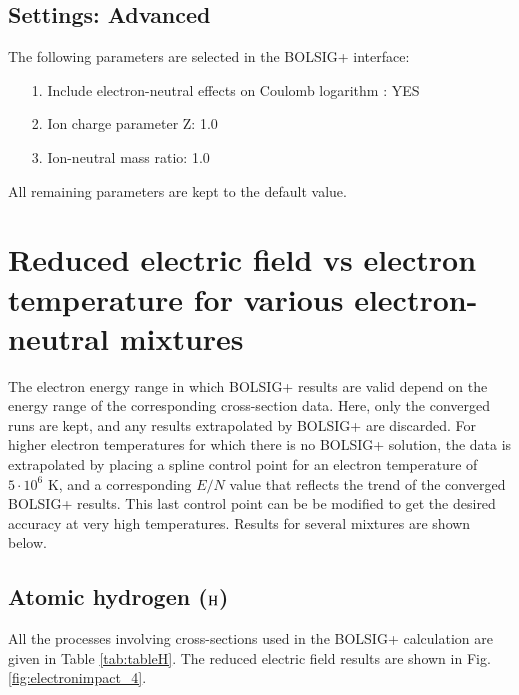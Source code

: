\subsection{Settings: Advanced}

The following parameters are selected in the BOLSIG+ interface:

\begin{itemize}
\item[1.]{Include electron-neutral effects on Coulomb logarithm : YES}
\item[2.]{Ion charge parameter Z: 1.0}
\item[3.]{Ion-neutral mass ratio: 1.0}
\end{itemize}
All remaining parameters are kept to the default value.

\section{Reduced electric field vs electron temperature for various electron-neutral mixtures}

The electron energy range in which BOLSIG+ results are valid depend on the energy range of the corresponding cross-section data. Here, only the converged runs are kept, and any results extrapolated by BOLSIG+ are discarded. For higher electron temperatures for which there is no BOLSIG+ solution, the data is extrapolated by placing a spline control point for an electron temperature of $5\cdot10^6$ K, and a corresponding $E/N$ value that reflects the trend of the converged BOLSIG+ results. This last control point can be be modified to get the desired accuracy at very high temperatures. Results for several mixtures are shown below.

\subsection{Atomic hydrogen ($\rm H$)}

All the processes involving cross-sections used in the BOLSIG+ calculation are given in Table \ref{tab:tableH}. The reduced electric field results are shown in Fig. \ref{fig:electronimpact_4}.

